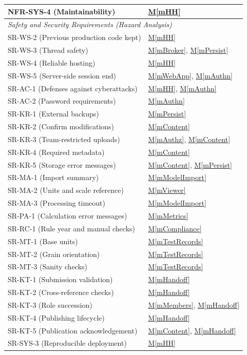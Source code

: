 \documentclass[12pt, titlepage]{article}
\newcommand{\mref}[1]{\hyperref[#1:dec]{M\ref*{#1}}}
\begin{document}
\begin{longtable}{p{} p{}}
NFR-SYS-4 (Maintainability) & \mref{mHH}\\
\midrule
\multicolumn{2}{l}{\emph{Safety and Security Requirements (Hazard Analysis)}}\\
SR-WS-2 (Previous production code kept) & \mref{mHH}\\
SR-WS-3 (Thread safety) & \mref{mBroker}, \mref{mPersist}\\
SR-WS-4 (Reliable hosting) & \mref{mHH}\\
SR-WS-5 (Server-side session end) & \mref{mWebApp}, \mref{mAuthn}\\
SR-AC-1 (Defenses against cyberattacks) & \mref{mHH}, \mref{mAuthn}\\
SR-AC-2 (Password requirements) & \mref{mAuthn}\\
SR-KR-1 (External backups) & \mref{mPersist}\\
SR-KR-2 (Confirm modifications) & \mref{mContent}\\
SR-KR-3 (Team-restricted uploads) & \mref{mAuthz}, \mref{mContent}\\
SR-KR-4 (Required metadata) & \mref{mContent}\\
SR-KR-5 (Storage error messages) & \mref{mContent}, \mref{mPersist}\\
SR-MA-1 (Import summary) & \mref{mModelImport}\\
SR-MA-2 (Units and scale reference) & \mref{mViewer}\\
SR-MA-3 (Processing timeout) & \mref{mModelImport}\\
SR-PA-1 (Calculation error messages) & \mref{mMetrics}\\
SR-RC-1 (Rule year and manual checks) & \mref{mCompliance}\\
SR-MT-1 (Base units) & \mref{mTestRecords}\\
SR-MT-2 (Grain orientation) & \mref{mTestRecords}\\
SR-MT-3 (Sanity checks) & \mref{mTestRecords}\\
SR-KT-1 (Submission validation) & \mref{mHandoff}\\
SR-KT-2 (Cross-reference checks) & \mref{mHandoff}\\
SR-KT-3 (Role succession) & \mref{mMembers}, \mref{mHandoff}\\
SR-KT-4 (Publishing lifecycle) & \mref{mHandoff}\\
SR-KT-5 (Publication acknowledgement) & \mref{mContent}, \mref{mHandoff}\\
SR-SYS-3 (Reproducible deployment) & \mref{mHH}\\
\end{longtable}
\end{document}
